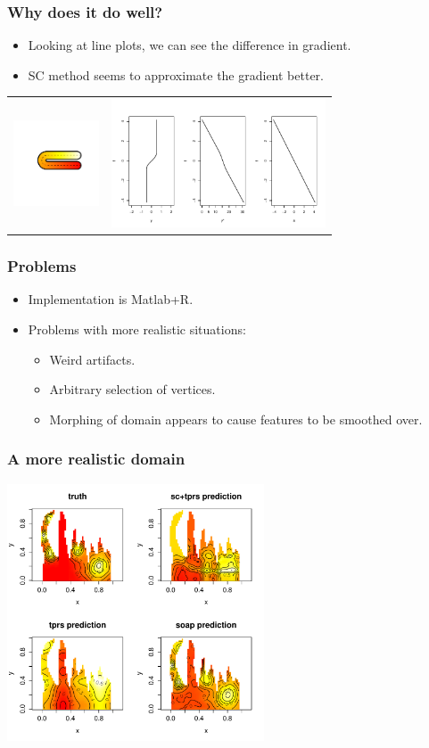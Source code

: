 \documentclass[ignorenonframetext]{beamer} %
\newcommand{\bc}{\begin{center}}
\newcommand{\ec}{\end{center}}
\newcommand{\bi}{\begin{itemize}}
\newcommand{\ei}{\end{itemize}}
\begin{document}
\begin{frame}
	\frametitle{Why does it do well?}
       \bi
         \item Looking at line plots, we can see the difference in gradient.
         \item SC method seems to approximate the gradient better.
       \ei
       \bc\begin{tabular}{c c}
            \centering
          \includegraphics[width=1in, trim=1in 0.75in 0.5in 0.5in]{figs/horseshoecentreline-1} & \includegraphics[width=2.5in]{figs/centrelinelineplots}\\
       \end{tabular}\ec
\end{frame}


\begin{frame}
	\frametitle{Problems}
       \bi
         \item Implementation is Matlab+R.
         \item Problems with more realistic situations:
         \bi
         \item Weird artifacts.
         \item Arbitrary selection of vertices.
         \item Morphing of domain appears to cause features to be smoothed over.
         \ei
        \ei
\end{frame}

\begin{frame}
	\frametitle{A more realistic domain}
            \centering
              \includegraphics[width=3in]{figs/wigglytop2-real}\\
\end{frame}
\end{document}
